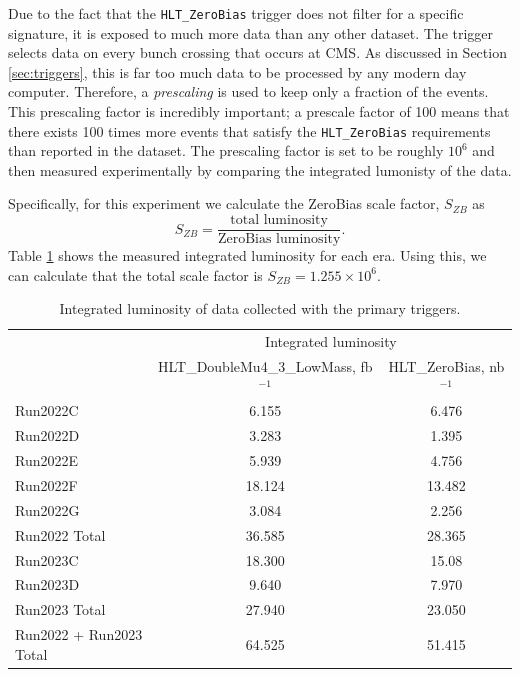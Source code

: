 Due to the fact that the \texttt{HLT\_ZeroBias} trigger does not filter for a specific signature, it is exposed to much more data than any other dataset. The trigger selects data on every bunch crossing that occurs at CMS. As discussed in Section \ref{sec:triggers}, this is far too much data to be processed by any modern day computer. Therefore, a \textit{prescaling} is used to keep only a fraction of the events. This prescaling factor is incredibly important; a prescale factor of 100 means that there exists 100 times more events that satisfy the \texttt{HLT\_ZeroBias} requirements than reported in the dataset. The prescaling factor is set to be roughly $10^{6}$ and then measured experimentally by comparing the integrated lumonisty of the data.

Specifically, for this experiment we calculate the ZeroBias scale factor, $S_{ZB}$ as 
\begin{equation}
    S_{ZB} = \frac{\text{total luminosity}}{\text{ZeroBias luminosity}}.
\end{equation}
Table \ref{tab:int_lumi_final} shows the measured integrated luminosity for each era. Using this, we can calculate that the total scale factor is $S_{ZB} = 1.255 \times 10^6$.

\begin{table}[htbp]
    \centering
    \begin{tabular}{|l|c|c|}
        \hline
         & \multicolumn{2}{c|}{Integrated luminosity} \\
        \cline{2-3}
         & HLT\_DoubleMu4\_3\_LowMass, fb$^{-1}$ & HLT\_ZeroBias, nb$^{-1}$ \\
        \hline
        Run2022C      & 6.155  & 6.476 \\
        Run2022D      & 3.283  & 1.395 \\
        Run2022E      & 5.939  & 4.756 \\
        Run2022F      & 18.124 & 13.482 \\
        Run2022G      & 3.084  & 2.256 \\
        \hline
        Run2022 Total & 36.585 & 28.365 \\
        \hline
        Run2023C      & 18.300 & 15.08 \\
        Run2023D      & 9.640  & 7.970 \\
        \hline
        Run2023 Total & 27.940 & 23.050 \\
        \hline
        Run2022 + Run2023 Total & 64.525 & 51.415 \\
        \hline
    \end{tabular}
    \caption{Integrated luminosity of data collected with the primary triggers.}
    \label{tab:int_lumi_final}
\end{table}

